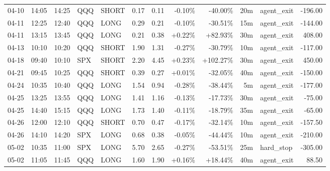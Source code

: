 \documentclass[11pt,a4paper,twoside]{article}
\begin{document}
\begin{center}
\begin{longtable}{>{\color{txtmain}}l l l l l r r r r r >{\color{txtmain}}l r}
04-10 & 14:05 & 14:25 & QQQ & SHORT & 0.17 & 0.11 & \textcolor{lossred}{-0.10\%} & \textcolor{lossred}{-40.00\%} & 20m & agent\_exit & \textcolor{lossred}{-196.00} \\
04-11 & 12:25 & 12:40 & QQQ & LONG & 0.29 & 0.21 & \textcolor{lossred}{-0.10\%} & \textcolor{lossred}{-30.51\%} & 15m & agent\_exit & \textcolor{lossred}{-144.00} \\
04-11 & 13:15 & 13:45 & QQQ & LONG & 0.21 & 0.38 & \textcolor{wingreen}{+0.22\%} & \textcolor{wingreen}{+82.93\%} & 30m & agent\_exit & \textcolor{wingreen}{408.00} \\
04-13 & 10:10 & 10:20 & QQQ & SHORT & 1.90 & 1.31 & \textcolor{lossred}{-0.27\%} & \textcolor{lossred}{-30.79\%} & 10m & agent\_exit & \textcolor{lossred}{-117.00} \\
04-18 & 09:40 & 10:10 & SPX & SHORT & 2.20 & 4.45 & \textcolor{wingreen}{+0.23\%} & \textcolor{wingreen}{+102.27\%} & 30m & agent\_exit & \textcolor{wingreen}{450.00} \\
04-21 & 09:45 & 10:25 & QQQ & SHORT & 0.39 & 0.27 & \textcolor{wingreen}{+0.01\%} & \textcolor{lossred}{-32.05\%} & 40m & agent\_exit & \textcolor{lossred}{-150.00} \\
04-24 & 10:35 & 10:40 & QQQ & LONG & 1.54 & 0.94 & \textcolor{lossred}{-0.28\%} & \textcolor{lossred}{-38.44\%} & 5m & agent\_exit & \textcolor{lossred}{-177.00} \\
04-25 & 13:25 & 13:55 & QQQ & LONG & 1.41 & 1.16 & \textcolor{lossred}{-0.13\%} & \textcolor{lossred}{-17.73\%} & 30m & agent\_exit & \textcolor{lossred}{-75.00} \\
04-25 & 14:40 & 15:15 & QQQ & LONG & 1.73 & 1.40 & \textcolor{lossred}{-0.11\%} & \textcolor{lossred}{-18.79\%} & 35m & agent\_exit & \textcolor{lossred}{-65.00} \\
04-26 & 12:00 & 12:10 & QQQ & SHORT & 0.70 & 0.47 & \textcolor{lossred}{-0.17\%} & \textcolor{lossred}{-32.14\%} & 10m & agent\_exit & \textcolor{lossred}{-157.50} \\
04-26 & 14:10 & 14:20 & SPX & LONG & 0.68 & 0.38 & \textcolor{lossred}{-0.05\%} & \textcolor{lossred}{-44.44\%} & 10m & agent\_exit & \textcolor{lossred}{-210.00} \\
05-02 & 10:35 & 11:00 & SPX & LONG & 5.70 & 2.65 & \textcolor{lossred}{-0.27\%} & \textcolor{lossred}{-53.51\%} & 25m & hard\_stop & \textcolor{lossred}{-305.00} \\
05-02 & 11:05 & 11:45 & QQQ & LONG & 1.60 & 1.90 & \textcolor{wingreen}{+0.16\%} & \textcolor{wingreen}{+18.44\%} & 40m & agent\_exit & \textcolor{wingreen}{88.50} \\

\end{longtable}
\end{center}
\end{document}

